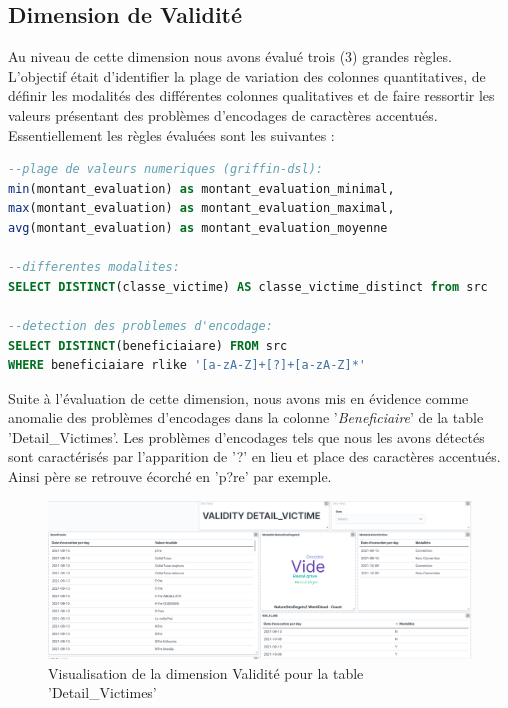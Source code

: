 \subsection{Dimension de Validit\'e} 
Au niveau de cette dimension nous avons \'evalu\'e trois (3) grandes r\`egles. L'objectif \'etait d'identifier la plage de variation des colonnes quantitatives, de d\'efinir les modalit\'es des diff\'erentes colonnes qualitatives et de faire ressortir les valeurs pr\'esentant des probl\`emes d'encodages de caract\`eres accentu\'es. Essentiellement les r\`egles \'evalu\'ees sont les suivantes : 
\newpage
\begin{lstlisting}[language=SQL,caption={R\`egles de la Dimension Validit\'e},captionpos=t,showspaces=false,basicstyle=\scriptsize,numbers=none,commentstyle=\color{gray},backgroundcolor=\color{background}]
--plage de valeurs numeriques (griffin-dsl): 
min(montant_evaluation) as montant_evaluation_minimal,
max(montant_evaluation) as montant_evaluation_maximal, 
avg(montant_evaluation) as montant_evaluation_moyenne

--differentes modalites:
SELECT DISTINCT(classe_victime) AS classe_victime_distinct from src

--detection des problemes d'encodage:
SELECT DISTINCT(beneficiaiare) FROM src 
WHERE beneficiaiare rlike '[a-zA-Z]+[?]+[a-zA-Z]*'
\end{lstlisting}
Suite \`a l'\'evaluation de cette dimension, nous avons mis en \'evidence comme anomalie des probl\`emes d'encodages dans la colonne '\textit{Beneficiaire}' de la table 'Detail\_Victimes'.  Les probl\`emes d'encodages tels que nous les avons d\'etect\'es sont caract\'eris\'es par l'apparition de '?' en lieu et place des caract\`eres accentu\'es. Ainsi p\`ere se retrouve écorché en 'p?re' par exemple.
\begin{figure}[H]
        \caption{Visualisation de la dimension Validit\'e pour la table 'Detail\_Victimes'}  \label{fig:tttay}
    \begin{center}
      \includegraphics[scale = 0.27]{Main/Static/Validity_Detail_Victime.png} 
    \end{center}
\end{figure}

